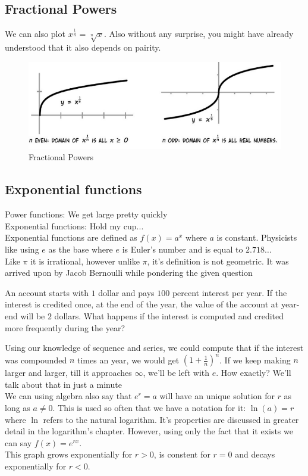 \subsection{Fractional Powers}
We can also plot $x^{\frac{1}{n}}=\sqrt[n]{x}$. Also without any surprise, you might have already understood that it also depends on pairity.\\
\begin{figure} [h]
    \centering
    \includegraphics[width=0.5\linewidth]{Photos/Fractional Powers.png}
    \caption{Fractional Powers}
    
\end{figure}
\subsection{Exponential functions}
Power functions: We get large pretty quickly\\
Exponential functions: Hold my cup...\\
Exponential functions are defined as $f(x)=a^x$ where $a$ is constant.  Physicists like using $e$ as the base where $e$ is Euler's number and is equal to $2.718 \dots$\\
Like $\pi$ it is irrational, however unlike $\pi$, it's definition is not geometric.  It was arrived upon by Jacob Bernoulli while pondering the given question\\
\begin{example}
    An account starts with $1$ dollar and pays $100$ percent interest per year. If the interest is credited once, at the end of the year, the value of the account at year-end will be $2$ dollars. What happens if the interest is computed and credited more frequently during the year?
\end{example}
Using our knowledge of sequence and series, we could compute that if the interest was compounded $n$ times an year, we would get $(1+\frac{1}{n})^n$.  If we keep making $n$ larger and larger, till it approaches $\infty$, we'll be left with $e$. How exactly? We'll talk about that in just a minute \\
We can using algebra also say that $e^r=a$ will have an unique solution for $r$ as long as $a \neq 0$. This is used so often that we have a notation for it: $\ln(a)=r$ where $\ln$ refers to the natural logarithm. It's properties are discussed in greater detail in the logarithm's chapter. However, using only the fact that it exists we can say $f(x)=e^{rx}$. \\
This graph grows exponentially for $r>0$, is constent for $r=0$ and decays exponentially for $r<0$.\\
